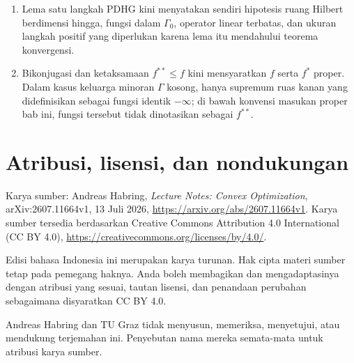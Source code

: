 \documentclass[indonesian]{shinybook}
\begin{document}
\begin{enumerate}
    \item Lema satu langkah PDHG kini menyatakan sendiri hipotesis ruang Hilbert berdimensi hingga, fungsi dalam $\Gamma_0$, operator linear terbatas, dan ukuran langkah positif yang diperlukan karena lema itu mendahului teorema konvergensi.
    \item Bikonjugasi dan ketaksamaan $f^{**}\leq f$ kini mensyaratkan $f$ serta $f^*$ proper. Dalam kasus keluarga minoran $\Gamma$ kosong, hanya supremum ruas kanan yang didefinisikan sebagai fungsi identik $-\infty$; di bawah konvensi masukan proper bab ini, fungsi tersebut tidak dinotasikan sebagai $f^{**}$.
\end{enumerate}

\chapter*{Atribusi, lisensi, dan nondukungan}
Karya sumber: Andreas Habring, \emph{Lecture Notes: Convex Optimization}, arXiv:2607.11664v1, 13 Juli 2026, \url{https://arxiv.org/abs/2607.11664v1}. Karya sumber tersedia berdasarkan Creative Commons Attribution 4.0 International (CC BY 4.0), \url{https://creativecommons.org/licenses/by/4.0/}.

Edisi bahasa Indonesia ini merupakan karya turunan. Hak cipta materi sumber tetap pada pemegang haknya. Anda boleh membagikan dan mengadaptasinya dengan atribusi yang sesuai, tautan lisensi, dan penandaan perubahan sebagaimana disyaratkan CC BY 4.0.

Andreas Habring dan TU Graz tidak menyusun, memeriksa, menyetujui, atau mendukung terjemahan ini. Penyebutan nama mereka semata-mata untuk atribusi karya sumber.
\end{document}
